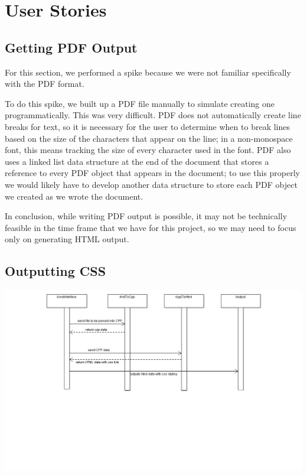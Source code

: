 \section{User Stories}

\subsection{Getting PDF Output}
For this section, we performed a spike because we were not familiar specifically with the PDF format.

To do this spike, we built up a PDF file manually to simulate creating one programmatically. This was very difficult. PDF does not automatically create line breaks for text, so it is necessary for the user to determine when to break lines based on the size of the characters that appear on the line; in a non-monospace font, this means tracking the size of every character used in the font. PDF also uses a linked list data structure at the end of the document that stores a reference to every PDF object that appears in the document; to use this properly we would likely have to develop another data structure to store each PDF object we created as we wrote the document.

In conclusion, while writing PDF output is possible, it may not be technically feasible in the time frame that we have for this project, so we may need to focus only on generating HTML output.

\subsection{Outputting CSS}
\hspace{-5cm}\includegraphics[width=700pt]{images/Output.png}

